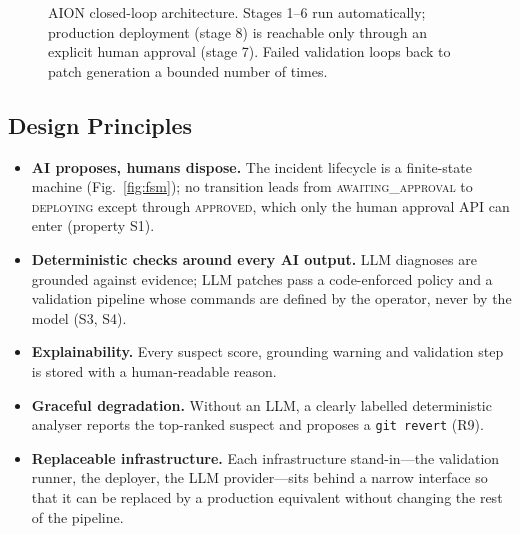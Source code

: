 \documentclass[conference]{IEEEtran}
\begin{document}
\begin{figure}[t]
{}
\caption{AION closed-loop architecture. Stages 1--6 run automatically; production deployment (stage 8) is reachable only through an explicit human approval (stage 7). Failed validation loops back to patch generation a bounded number of times.}
\label{fig:arch}
\end{figure}

\subsection{Design Principles}
\begin{itemize}
\item \textbf{AI proposes, humans dispose.} The incident lifecycle is a finite-state machine (Fig.~\ref{fig:fsm}); no transition leads from \textsc{awaiting\_approval} to \textsc{deploying} except through \textsc{approved}, which only the human approval API can enter (property S1).
\item \textbf{Deterministic checks around every AI output.} LLM diagnoses are grounded against evidence; LLM patches pass a code-enforced policy and a validation pipeline whose commands are defined by the operator, never by the model (S3, S4).
\item \textbf{Explainability.} Every suspect score, grounding warning and validation step is stored with a human-readable reason.
\item \textbf{Graceful degradation.} Without an LLM, a clearly labelled deterministic analyser reports the top-ranked suspect and proposes a \texttt{git revert} (R9).
\item \textbf{Replaceable infrastructure.} Each infrastructure stand-in---the validation runner, the deployer, the LLM provider---sits behind a narrow interface so that it can be replaced by a production equivalent without changing the rest of the pipeline.
\end{itemize}
\end{document}
